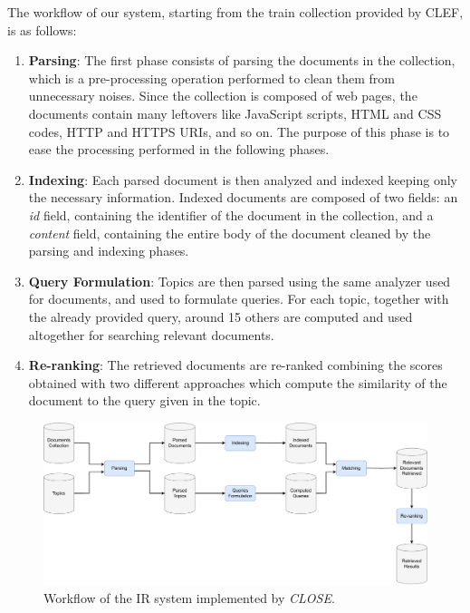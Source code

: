 The workflow of our system, starting from the train collection provided by \ac{CLEF}, is as follows:
\begin{enumerate}
    \item \textbf{Parsing}: The first phase consists of parsing the documents in the collection, which is a pre-processing operation performed to clean them from unnecessary noises. Since the collection is composed of web pages, the documents contain many leftovers like JavaScript scripts, HTML and CSS codes, HTTP and HTTPS URIs, and so on. The purpose of this phase is to ease the processing performed in the following phases.

    \item \textbf{Indexing}: Each parsed document is then analyzed and indexed keeping only the necessary information. Indexed documents are composed of two fields: an \textit{id} field, containing the identifier of the document in the collection, and a \textit{content} field, containing the entire body of the document cleaned by the parsing and indexing phases.

    \item \textbf{Query Formulation}: Topics are then parsed using the same analyzer used for documents, and used to formulate queries. For each topic, together with the already provided query, around 15 others are computed and used altogether for searching relevant documents.

    \item \textbf{Re-ranking}: The retrieved documents are re-ranked combining the scores obtained with two different approaches which compute the similarity of the document to the query given in the topic.

\end{enumerate}

\begin{figure}[!h]
    \centering
    \includegraphics[width=\textwidth, height=\textheight, keepaspectratio]{figure/CLOSE_IR_Workflow (2).pdf}
    \caption{Workflow of the IR system implemented by \textit{CLOSE}.}
    \label{fig:CLOSE_IR_Workflow}
\end{figure}


